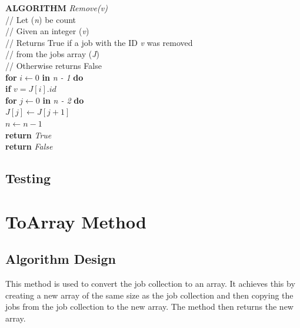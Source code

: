 \documentclass[12pt,a4paper]{article}
\begin{document}
			\textbf{ALGORITHM} \textit{Remove(v)}\\
			\null\hspace{1cm}// Let (\textit{n}) be count\\
			\null\hspace{1cm}// Given an integer (\textit{v})\\
			\null\hspace{1cm}// Returns True if a job with the ID \textit{v} was removed\\
			\null\hspace{1cm}// from the jobs array (\textit{J})\\
			\null\hspace{1cm}// Otherwise returns False\\
			\null\hspace{1cm}\textbf{for} \textit{$i \gets 0$} \textbf{in} \textit{n - 1} \textbf{do}\\
			\null\hspace{2cm}\textbf{if} \textit{$v = J[i].id$}\\
			\null\hspace{4cm}\textbf{for} \textit{$j \gets 0$} \textbf{in} \textit{n - 2} \textbf{do}\\
			\null\hspace{5cm}\textit{$J[j] \gets J[j + 1]$}\\
			\null\hspace{4cm}\textit{$n \gets n - 1$}\\
			\null\hspace{4cm}\textbf{return} \textit{True}\\
			\null\hspace{1cm}\textbf{return} \textit{False}\\
			
		\subsection{Testing}

			
	\section{ToArray Method}
		\subsection{Algorithm Design}
			This method is used to convert the job collection to an array. It achieves this by creating a 
			new array of the same size as the job collection and then copying the jobs from the job 
			collection to the new array. The method then returns the new array.\\
\end{document}
